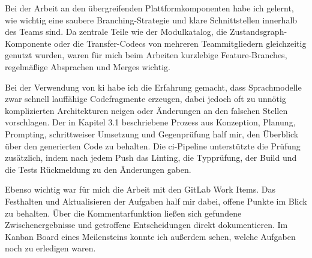 Bei der Arbeit an den übergreifenden Plattformkomponenten habe ich gelernt, wie wichtig eine saubere Branching-Strategie und klare Schnittstellen innerhalb des Teams sind. Da zentrale Teile wie der Modulkatalog, die Zustandsgraph-Komponente oder die Transfer-Codecs von mehreren Teammitgliedern gleichzeitig genutzt wurden, waren für mich beim Arbeiten kurzlebige Feature-Branches, regelmäßige Absprachen und Merges wichtig.

Bei der Verwendung von \gls{ki} habe ich die Erfahrung gemacht, dass Sprachmodelle zwar schnell lauffähige Codefragmente erzeugen, dabei jedoch oft zu unnötig komplizierten Architekturen neigen oder Änderungen an den falschen Stellen vorschlagen. Der in Kapitel 3.1 beschriebene Prozess aus Konzeption, Planung, Prompting, schrittweiser Umsetzung und Gegenprüfung half mir, den Überblick über den generierten Code zu behalten. Die \gls{ci}-Pipeline unterstützte die Prüfung zusätzlich, indem nach jedem Push das Linting, die Typprüfung, der Build und die Tests Rückmeldung zu den Änderungen gaben.

Ebenso wichtig war für mich die Arbeit mit den GitLab Work Items. Das Festhalten und Aktualisieren der Aufgaben half mir dabei, offene Punkte im Blick zu behalten. Über die Kommentarfunktion ließen sich gefundene Zwischenergebnisse und getroffene Entscheidungen direkt dokumentieren. Im Kanban Board eines Meilensteins konnte ich außerdem sehen, welche Aufgaben noch zu erledigen waren.